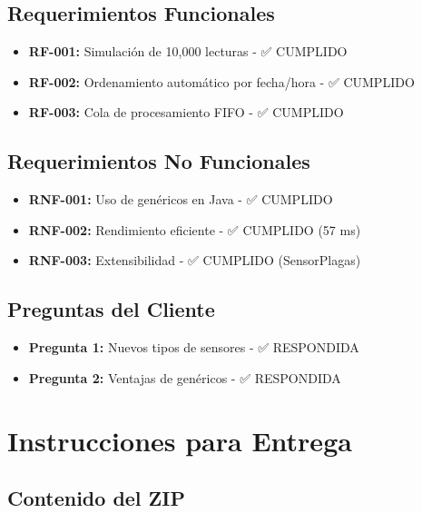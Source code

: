 \documentclass[12pt,a4paper]{article}
\begin{document}
\subsection{Requerimientos Funcionales}

\begin{itemize}[label=\textcolor{green!70!black}{$\bullet$}]
    \item \textbf{RF-001:} Simulación de 10,000 lecturas - ✅ CUMPLIDO
    \item \textbf{RF-002:} Ordenamiento automático por fecha/hora - ✅ CUMPLIDO
    \item \textbf{RF-003:} Cola de procesamiento FIFO - ✅ CUMPLIDO
\end{itemize}

\subsection{Requerimientos No Funcionales}

\begin{itemize}[label=\textcolor{green!70!black}{$\bullet$}]
    \item \textbf{RNF-001:} Uso de genéricos en Java - ✅ CUMPLIDO
    \item \textbf{RNF-002:} Rendimiento eficiente - ✅ CUMPLIDO (57 ms)
    \item \textbf{RNF-003:} Extensibilidad - ✅ CUMPLIDO (SensorPlagas)
\end{itemize}

\subsection{Preguntas del Cliente}

\begin{itemize}[label=\textcolor{green!70!black}{$\bullet$}]
    \item \textbf{Pregunta 1:} Nuevos tipos de sensores - ✅ RESPONDIDA
    \item \textbf{Pregunta 2:} Ventajas de genéricos - ✅ RESPONDIDA
\end{itemize}


\section{Instrucciones para Entrega}

\subsection{Contenido del ZIP}
\end{document}
